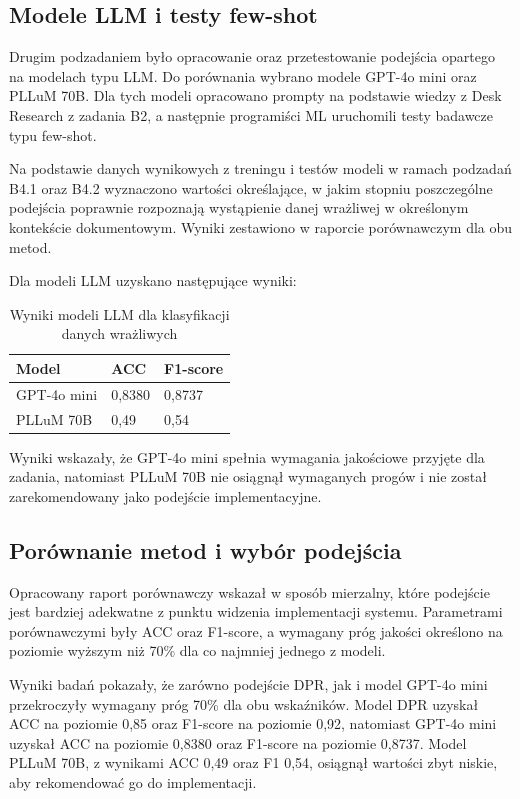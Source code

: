 \documentclass[12pt,a4paper]{report}
\begin{document}
\subsection{Modele LLM i testy few-shot}
Drugim podzadaniem było opracowanie oraz przetestowanie podejścia opartego na modelach typu LLM. Do porównania wybrano modele GPT-4o mini oraz PLLuM 70B. Dla tych modeli opracowano prompty na podstawie wiedzy z Desk Research z zadania B2, a następnie programiści ML uruchomili testy badawcze typu few-shot.

Na podstawie danych wynikowych z treningu i testów modeli w ramach podzadań B4.1 oraz B4.2 wyznaczono wartości określające, w jakim stopniu poszczególne podejścia poprawnie rozpoznają wystąpienie danej wrażliwej w określonym kontekście dokumentowym. Wyniki zestawiono w raporcie porównawczym dla obu metod.

Dla modeli LLM uzyskano następujące wyniki:

\begin{table}[h]
    \centering
    \caption{Wyniki modeli LLM dla klasyfikacji danych wrażliwych}
    \begin{tabular}{l l l}
        \toprule
        Model & ACC & F1-score \\
        \midrule
        GPT-4o mini & 0{,}8380 & 0{,}8737 \\
        PLLuM 70B & 0{,}49 & 0{,}54 \\
        \bottomrule
    \end{tabular}
\end{table}

Wyniki wskazały, że GPT-4o mini spełnia wymagania jakościowe przyjęte dla zadania, natomiast PLLuM 70B nie osiągnął wymaganych progów i nie został zarekomendowany jako podejście implementacyjne.

\subsection{Porównanie metod i wybór podejścia}
Opracowany raport porównawczy wskazał w sposób mierzalny, które podejście jest bardziej adekwatne z punktu widzenia implementacji systemu. Parametrami porównawczymi były ACC oraz F1-score, a wymagany próg jakości określono na poziomie wyższym niż 70\% dla co najmniej jednego z modeli.

Wyniki badań pokazały, że zarówno podejście DPR, jak i model GPT-4o mini przekroczyły wymagany próg 70\% dla obu wskaźników. Model DPR uzyskał ACC na poziomie 0{,}85 oraz F1-score na poziomie 0{,}92, natomiast GPT-4o mini uzyskał ACC na poziomie 0{,}8380 oraz F1-score na poziomie 0{,}8737. Model PLLuM 70B, z wynikami ACC 0{,}49 oraz F1 0{,}54, osiągnął wartości zbyt niskie, aby rekomendować go do implementacji.
\end{document}
